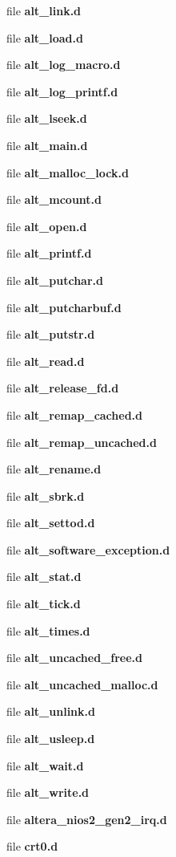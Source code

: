 \begin{DoxyCompactItemize}
file {\bf alt\+\_\+link.\+d}
\item 
file {\bf alt\+\_\+load.\+d}
\item 
file {\bf alt\+\_\+log\+\_\+macro.\+d}
\item 
file {\bf alt\+\_\+log\+\_\+printf.\+d}
\item 
file {\bf alt\+\_\+lseek.\+d}
\item 
file {\bf alt\+\_\+main.\+d}
\item 
file {\bf alt\+\_\+malloc\+\_\+lock.\+d}
\item 
file {\bf alt\+\_\+mcount.\+d}
\item 
file {\bf alt\+\_\+open.\+d}
\item 
file {\bf alt\+\_\+printf.\+d}
\item 
file {\bf alt\+\_\+putchar.\+d}
\item 
file {\bf alt\+\_\+putcharbuf.\+d}
\item 
file {\bf alt\+\_\+putstr.\+d}
\item 
file {\bf alt\+\_\+read.\+d}
\item 
file {\bf alt\+\_\+release\+\_\+fd.\+d}
\item 
file {\bf alt\+\_\+remap\+\_\+cached.\+d}
\item 
file {\bf alt\+\_\+remap\+\_\+uncached.\+d}
\item 
file {\bf alt\+\_\+rename.\+d}
\item 
file {\bf alt\+\_\+sbrk.\+d}
\item 
file {\bf alt\+\_\+settod.\+d}
\item 
file {\bf alt\+\_\+software\+\_\+exception.\+d}
\item 
file {\bf alt\+\_\+stat.\+d}
\item 
file {\bf alt\+\_\+tick.\+d}
\item 
file {\bf alt\+\_\+times.\+d}
\item 
file {\bf alt\+\_\+uncached\+\_\+free.\+d}
\item 
file {\bf alt\+\_\+uncached\+\_\+malloc.\+d}
\item 
file {\bf alt\+\_\+unlink.\+d}
\item 
file {\bf alt\+\_\+usleep.\+d}
\item 
file {\bf alt\+\_\+wait.\+d}
\item 
file {\bf alt\+\_\+write.\+d}
\item 
file {\bf altera\+\_\+nios2\+\_\+gen2\+\_\+irq.\+d}
\item 
file {\bf crt0.\+d}
\end{DoxyCompactItemize}

